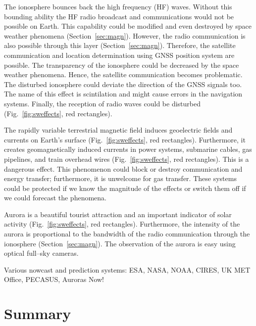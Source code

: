 \documentclass[sn-aps]{sn-jnl}%
\begin{document}
The ionosphere bounces back the high frequency (HF) waves. Without this bounding ability the HF radio broadcast and communications would not be possible on Earth. This capability could be modified and even destroyed by space weather phenomena (Section~\ref{sec:magn}). However, the radio communication is also possible through this layer (Section~\ref{sec:magn}). Therefore, the satellite communication and location determination using GNSS position system are possible. The transparency of the ionosphere could be decreased by the space weather phenomena. Hence, the satellite communication becomes problematic. The disturbed ionosphere could deviate the direction of the GNSS signals too. The name of this effect is scintilation and might cause errors in the navigation systems. Finally, the reception of radio waves could be disturbed (Fig.~\ref{fig:sweffects}, red rectangles).

The rapidly variable terrestrial magnetic field induces geoelectric fields and currents on Earth's surface (Fig.~\ref{fig:sweffects}, red rectangles). Furthermore, it creates geomagnetically induced currents in power systems, submarine cables, gas pipelines, and train overhead wires (Fig.~\ref{fig:sweffects}, red rectangles). This is a dangerous effect. This phenomenon could block or destroy communication and energy transfer; furthermore, it is unwelcome for gas transfer. These systems could be protected if we know the magnitude of the effects or switch them off if we could forecast the phenomena. 

Aurora is a beautiful tourist attraction and an important indicator of solar activity (Fig.~\ref{fig:sweffects}, red rectangles). Furthermore, the intensity of the aurora is proportional to the bandwidth of the radio communication through the ionosphere (Section~\ref{sec:magn}). The observation of the aurora is easy using optical full--sky cameras.



Various nowcast and prediction systems: ESA, NASA, NOAA, CIRES, UK MET Office, PECASUS, Auroras Now!

\section{Summary}
\label{sec:sum}
\end{document}
